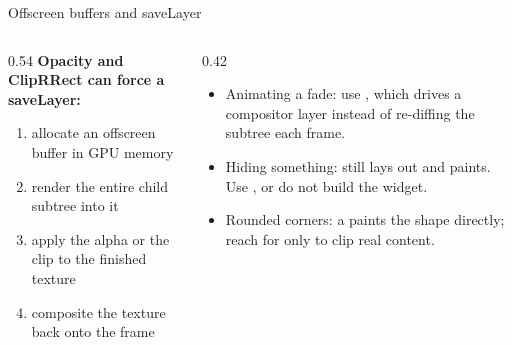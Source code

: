 \documentclass[10pt,aspectratio=169,t]{beamer}
\begin{document}
\begin{frame}[eyebrow=Optimization]{Offscreen buffers and saveLayer}
  \begin{columns}[T]
    \begin{column}{0.54\textwidth}
      \textbf{Opacity and ClipRRect can force a saveLayer:}
      \begin{enumerate}
        \item allocate an offscreen buffer in GPU memory
        \item render the entire child subtree into it
        \item apply the alpha or the clip to the finished texture
        \item composite the texture back onto the frame
      \end{enumerate}
    \end{column}
    \begin{column}{0.42\textwidth}
      \begin{itemize}
        \item Animating a fade: use , which drives a compositor layer instead of re-diffing the subtree each frame.
        \item Hiding something:  still lays out and paints. Use , or do not build the widget.
        \item Rounded corners: a  paints the shape directly; reach for  only to clip real content.
      \end{itemize}
    \end{column}
  \end{columns}
\end{frame}
\end{document}

